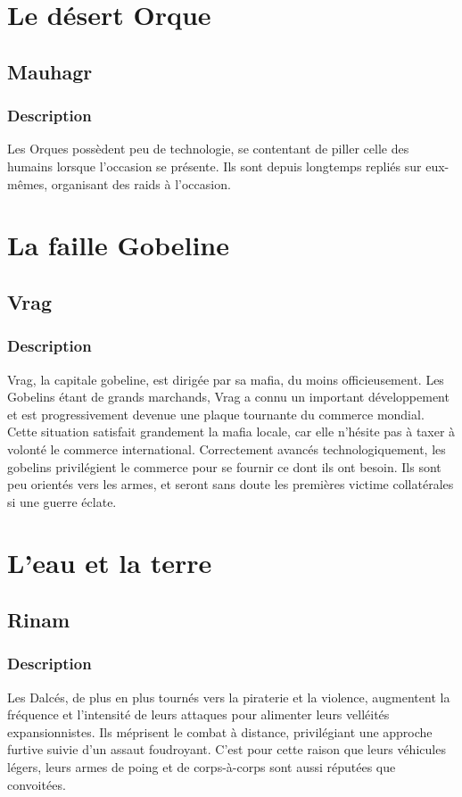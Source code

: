 \section{Le désert Orque}
\subsection{Mauhagr}
\subsubsection{Description}
Les Orques possèdent peu de technologie, se contentant de piller celle des humains lorsque l'occasion se présente. Ils sont depuis longtemps repliés sur eux-mêmes, organisant des raids à l'occasion.
\section{La faille Gobeline}
\subsection{Vrag}
\subsubsection{Description}
Vrag, la capitale gobeline, est dirigée par sa mafia, du moins officieusement. Les Gobelins étant de grands marchands, Vrag a connu un important développement et est progressivement devenue une plaque tournante du commerce mondial. Cette situation satisfait grandement la mafia locale, car elle n'hésite pas à taxer à volonté le commerce international. Correctement avancés technologiquement, les gobelins privilégient le commerce pour se fournir ce dont ils ont besoin. Ils sont peu orientés vers les armes, et seront sans doute les premières victime collatérales si une guerre éclate.
\section{L'eau et la terre}
\subsection{Rinam}
\subsubsection{Description}
Les Dalcés, de plus en plus tournés vers la piraterie et la violence, augmentent la fréquence et l'intensité de leurs attaques pour alimenter leurs velléités expansionnistes. Ils méprisent le combat à distance, privilégiant une approche furtive suivie d'un assaut foudroyant. C'est pour cette raison que leurs véhicules légers, leurs armes de poing et de corps-à-corps sont aussi réputées que convoitées.
